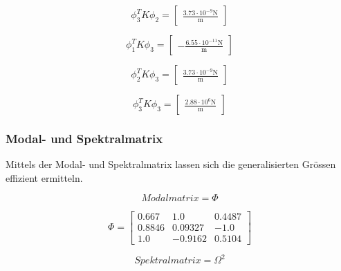 \documentclass[
  letterpaper,
  DIV=11]{scrreprt}
\begin{document}
\begin{equation}\phi_{3}^{T} K \phi_{2} = \left[\begin{matrix}\frac{3.73 \cdot 10^{-9} \text{N}}{\text{m}}\end{matrix}\right]\end{equation}

\begin{equation}\phi_{1}^{T} K \phi_{3} = \left[\begin{matrix}- \frac{6.55 \cdot 10^{-11} \text{N}}{\text{m}}\end{matrix}\right]\end{equation}

\begin{equation}\phi_{2}^{T} K \phi_{3} = \left[\begin{matrix}\frac{3.73 \cdot 10^{-9} \text{N}}{\text{m}}\end{matrix}\right]\end{equation}

\begin{equation}\phi_{3}^{T} K \phi_{3} = \left[\begin{matrix}\frac{2.88 \cdot 10^{6} \text{N}}{\text{m}}\end{matrix}\right]\end{equation}

\hypertarget{modal--und-spektralmatrix-1}{%
\subsubsection{Modal- und
Spektralmatrix}\label{modal--und-spektralmatrix-1}}

Mittels der Modal- und Spektralmatrix lassen sich die generalisierten
Grössen effizient ermitteln.

\begin{equation}Modalmatrix = \Phi\end{equation}

\begin{equation}\Phi = \left[\begin{matrix}0.667 & 1.0 & 0.4487\\0.8846 & 0.09327 & -1.0\\1.0 & -0.9162 & 0.5104\end{matrix}\right]\end{equation}

\begin{equation}Spektralmatrix = \Omega^{2}\end{equation}
\end{document}
